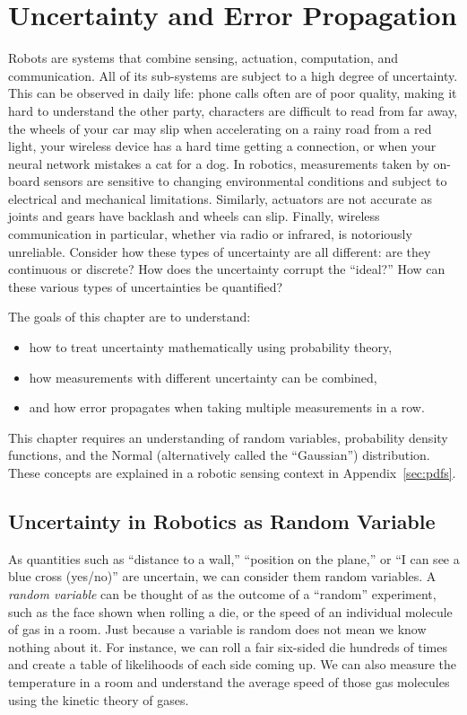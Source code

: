\chapter{Uncertainty and Error Propagation}\label{chap:uncertainty}

Robots are systems that combine sensing, actuation, computation, and communication. All of its sub-systems are subject to a high degree
of uncertainty. This can be observed in daily life: phone calls often are of poor quality, making it hard to understand the other party,
characters are difficult to read from far away,  the wheels of your car may slip when accelerating on a rainy road from a red light,
your wireless device has a hard time getting a connection, or when your neural network mistakes a cat for a dog. In robotics, measurements
taken by on-board sensors are sensitive to changing environmental conditions and subject to electrical and mechanical limitations.
Similarly, actuators are not accurate as joints and gears have backlash and wheels can slip. Finally, wireless communication in particular,
whether via radio or infrared, is notoriously unreliable. Consider how these types of
uncertainty are all different: are they continuous or discrete? How does the uncertainty corrupt the ``ideal?'' How can these various
types of uncertainties be quantified?

The goals of this chapter are to understand:
\begin{itemize}
    \item how to treat uncertainty mathematically using probability theory,
    \item how measurements with different uncertainty can be combined,
    \item and how error propagates when taking multiple measurements in a row.
\end{itemize}

This chapter requires an understanding of random variables, probability density functions, and the Normal
(alternatively called the ``Gaussian'') distribution. These concepts are explained in a robotic sensing context in Appendix~\ref{sec:pdfs}.

\section{Uncertainty in Robotics as Random Variable}

As quantities such as ``distance to a wall,'' ``position on the plane,'' or ``I can see a blue cross (yes/no)'' are uncertain, we can
consider them random variables. A \textsl{random variable} can be thought of as the outcome of a ``random''
experiment, such as the face shown when rolling a die, or the speed of an individual molecule of gas in a room. Just because a
variable is random does not mean we know nothing about it. For instance, we can roll a fair six-sided die hundreds of times
and create a table of likelihoods of each side coming up. We can also measure the temperature in a room and understand the
average speed of those gas molecules using the kinetic theory of gases.

